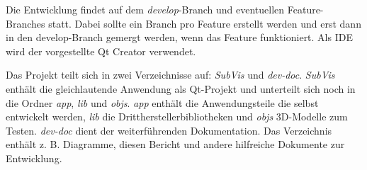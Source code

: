 Die Entwicklung findet auf dem \emph{develop}-Branch und eventuellen  Feature-Branches statt.
Dabei sollte ein Branch pro Feature erstellt werden und erst dann in den develop-Branch gemergt werden, wenn das Feature funktioniert.
Als IDE wird der vorgestellte Qt Creator verwendet.

Das Projekt teilt sich in zwei Verzeichnisse auf: \emph{SubVis} und \emph{dev-doc}.
\emph{SubVis} enthält die gleichlautende Anwendung als Qt-Projekt und unterteilt sich noch in die Ordner \emph{app}, \emph{lib} und \emph{objs}.
\emph{app} enthält die Anwendungsteile die selbst entwickelt werden,
\emph{lib} die Drittherstellerbibliotheken und \emph{objs} 3D-Modelle zum Testen.
\emph{dev-doc} dient der weiterführenden Dokumentation.
Das Verzeichnis enthält z. B. Diagramme, diesen Bericht und andere hilfreiche Dokumente zur Entwicklung.
































